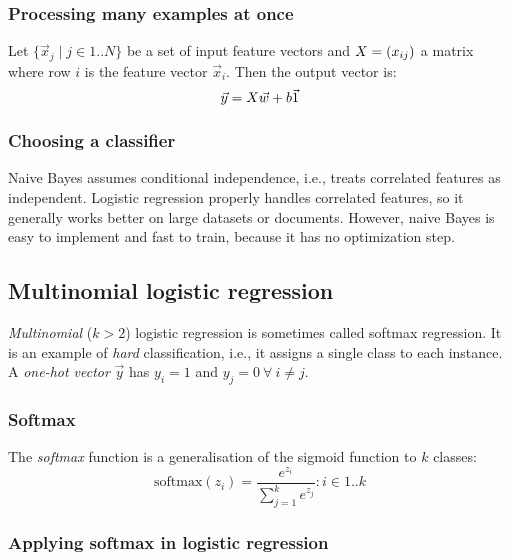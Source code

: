 \subsubsection{Processing many examples at once}

Let $\{ \vec{x}_j \mid j \in 1 .. N \}$ be a set of input feature vectors and $X = (x_{ij})$ a matrix where row $i$ is the feature vector $\vec{x}_i$.
Then the output vector is:
\begin{equation}
  \vec{y} = X \vec{w} + b \vec{1}
\end{equation}

\subsubsection{Choosing a classifier}

Naive Bayes assumes conditional independence, i.e., treats correlated features as independent.
Logistic regression properly handles correlated features, so it generally works better on large datasets or documents.
However, naive Bayes is easy to implement and fast to train, because it has no optimization step.

\subsection{Multinomial logistic regression}

\textit{Multinomial} ($k > 2$) logistic regression is sometimes called softmax regression.
It is an example of \textit{hard} classification, i.e., it assigns a single class to each instance.
A \textit{one-hot vector} $\vec{y}$ has $y_i = 1$ and $y_j = 0\ \forall\ i \neq j$.

\subsubsection{Softmax}

The \textit{softmax} function is a generalisation of the sigmoid function to $k$ classes:
\begin{equation}
  \label{eqnSoftmax}
  \text{softmax}(z_i) = \frac{e^{z_i}}{\sum_{j = 1}^{k} e^{z_j}} : i \in 1 .. k
\end{equation}

\subsubsection{Applying softmax in logistic regression}

